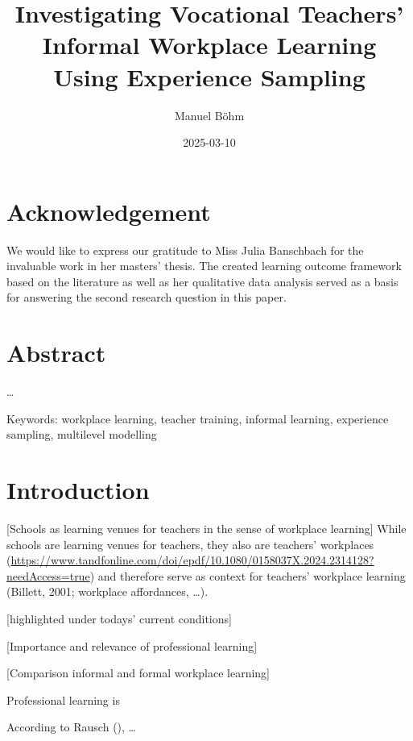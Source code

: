 \documentclass[
]{article}
\title{Investigating Vocational Teachers' Informal Workplace Learning
Using Experience Sampling}
\author{Manuel Böhm}
\date{2025-03-10}
\begin{document}
\maketitle

\renewcommand*\contentsname{Article Outline}
{
\setcounter{tocdepth}{2}
\tableofcontents
}
\newpage
{}

\section*{Acknowledgement}\label{acknowledgement}

We would like to express our gratitude to Miss Julia Banschbach for the
invaluable work in her masters' thesis. The created learning outcome
framework based on the literature as well as her qualitative data
analysis served as a basis for answering the second research question in
this paper.

\newpage

\section*{Abstract}\label{abstract}

\ldots{}

Keywords: workplace learning, teacher training, informal learning,
experience sampling, multilevel modelling

\newpage

\section{Introduction}\label{introduction}

{[}Schools as learning venues for teachers in the sense of workplace
learning{]} While schools are learning venues for teachers, they also
are teachers' workplaces
(\url{https://www.tandfonline.com/doi/epdf/10.1080/0158037X.2024.2314128?needAccess=true})
and therefore serve as context for teachers' workplace learning
(Billett, 2001; workplace affordances, \ldots).

{[}highlighted under todays' current conditions{]}

{[}Importance and relevance of professional learning{]}

{[}Comparison informal and formal workplace learning{]}

Professional learning is

According to Rausch
(), \ldots{}
\end{document}
